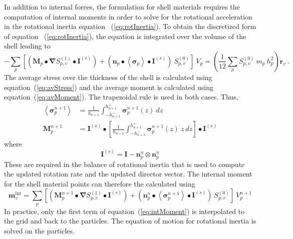       In addition to internal forces, the formulation for shell materials
      requires the computation of internal moments in order to solve for
      the rotational acceleration in the rotational inertia equation
      ~(\ref{eq:rotInertia}).  To obtain the discretized form of equation
      ~(\ref{eq:rotInertia}), the equation is integrated over the volume
      of the shell leading to~\cite{Lewis1998}
      \begin{equation}
      -\sum_p\left[\left(\mathbf{M}_p\bullet\boldsymbol{\nabla}S^{(1)}_{p,v}
        \bullet\mathbf{I}^{(s)}\right)+
        \left(\mathbf{n}_p\bullet\left<\boldsymbol{\sigma}_p\right>\bullet
       \mathbf{I}^{(s)}\right)~S^{(0)}_{p,v}\right]~V_p
      = \left(\frac{1}{12}\sum_p S^{(0)}_{p,v}~m_p~h^2_p\right)
        \dot{\mathbf{r}}_v~.
      \end{equation}
      The average stress over the thickness of the shell is calculated
      using equation~(\ref{eq:avStress}) and the average moment is 
      calculated using equation~(\ref{eq:avMoment}).  The trapezoidal rule is
      used in both cases.  Thus,
      \begin{align}
        \left<\boldsymbol{\sigma}_p^{n+1}\right> &=
             \frac{1}{h_{n+1}}\int^{h^+_{n+1}}_{-h^-_{n+1}} 
             \boldsymbol{\sigma}^{n+1}_p(z)~dz \\
        \mathbf{M}_p^{n+1} &= \mathbf{I}^{(s)}\bullet
              \left[ \frac{1}{h_{n+1}}\int^{h^+_{n+1}}_{-h^-_{n+1}}
              \boldsymbol{\sigma}_p^{n+1}(z)~z~dz
              \right]\bullet \mathbf{I}^{(s)}
      \end{align}
      where
      \begin{equation} 
        \mathbf{I}^{(s)} = \mathbf{I} - \mathbf{n}_p^n\otimes\mathbf{n}_p^n
      \end{equation} 
      These are required in the balance of rotational inertia that is used
      to compute the updated rotation rate and the updated director vector.
      The internal moment for the shell material points can therefore the
      calculated using
      \begin{equation}
        \mathbf{m}_v^{\text{int}} = 
          \sum_p\left[\left(\mathbf{M}_p^{n+1}\bullet
            \boldsymbol{\nabla}S^{(1)}_{p,v}
            \bullet\mathbf{I}^{(s)}\right)+
        \left(\mathbf{n}_p^{n}\bullet\left<\boldsymbol{\sigma}_p^{n+1}
          \right>\bullet
       \mathbf{I}^{(s)}\right)~S^{(0)}_{p,v}\right]~V_p^{n+1}
       \label{eq:intMoment}
      \end{equation}
      In practice, only the first term of equation~(\ref{eq:intMoment}) is
      interpolated to the grid and back to the particles.  The equation of 
      motion for rotational inertia is solved on the particles.
